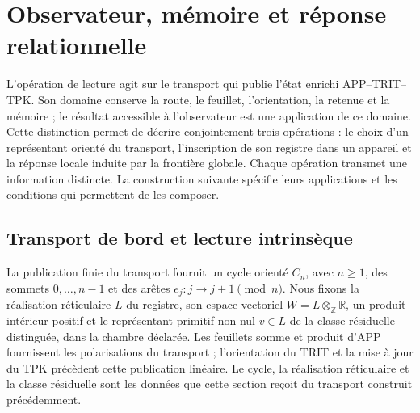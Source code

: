 
\section{Observateur, mémoire et réponse relationnelle}
\label{vii:vii:sec:observador-respuesta}

L'opération de lecture agit sur le transport qui publie l'état
enrichi APP--TRIT--TPK. Son domaine conserve la route, le feuillet, l'orientation,
la retenue et la mémoire ; le résultat accessible à l'observateur est une application
de ce domaine. Cette distinction permet de décrire conjointement trois
opérations : le choix d'un représentant orienté du transport,
l'inscription de son registre dans un appareil et la réponse locale induite
par la frontière globale. Chaque opération transmet une information distincte.
La construction suivante spécifie leurs applications et les conditions qui
permettent de les composer.

\subsection{Transport de bord et lecture intrinsèque}
\label{vii:vii:sec:observador-ciclo}

La publication finie du transport fournit un cycle orienté
\(C_n\), avec \(n\geq1\), des sommets \(0,\ldots,n-1\) et des arêtes
\(e_j:j\longrightarrow j+1\pmod n\). Nous fixons la réalisation réticulaire
\(L\) du registre, son espace vectoriel
\(W=L\otimes_{\mathbb Z}\mathbb R\), un produit intérieur positif et
le représentant primitif non nul \(v\in L\) de la classe résiduelle
distinguée, dans la chambre déclarée. Les feuillets somme et produit d'APP
fournissent les polarisations du transport ; l'orientation du TRIT et la
mise à jour du TPK précèdent cette publication linéaire. Le cycle,
la réalisation réticulaire et la classe résiduelle sont les données que cette
section reçoit du transport construit précédemment.

